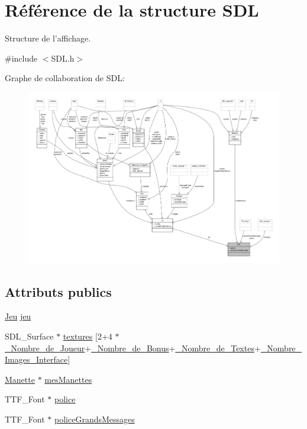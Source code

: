 \hypertarget{structSDL}{\section{Référence de la structure S\-D\-L}
\label{structSDL}
}


Structure de l'affichage.  




{\ttfamily \#include $<$S\-D\-L.\-h$>$}



Graphe de collaboration de S\-D\-L\-:
\nopagebreak
\begin{figure}[H]
\begin{center}
\leavevmode
\includegraphics[width=350pt]{structSDL__coll__graph}
\end{center}
\end{figure}
\subsection*{Attributs publics}
\begin{DoxyCompactItemize}
\item 
\hyperlink{structJeu}{Jeu} \hyperlink{structSDL_aed6e34a843f7e278abbc6401e7a86748}{jeu}
\item 
S\-D\-L\-\_\-\-Surface $\ast$ \hyperlink{structSDL_a7a8c5288d76cf72d0f5ba90ef4046d58}{textures} \mbox{[}2+4 $\ast$\hyperlink{Constantes_8h_a505b3b803482fbd73a5eafac78db730f}{\-\_\-\-Nombre\-\_\-de\-\_\-\-Joueur}+\hyperlink{Constantes_8h_af4e31715ab308023d6200e64b86b9946}{\-\_\-\-Nombre\-\_\-de\-\_\-\-Bonus}+\hyperlink{Constantes_8h_a64872e3ddf1efd6847f90dbcb0ed21ce}{\-\_\-\-Nombre\-\_\-de\-\_\-\-Textes}+\hyperlink{Constantes_8h_a228aa6ff538af983b44e972225d962b9}{\-\_\-\-Nombre\-\_\-\-Images\-\_\-\-Interface}\mbox{]}
\item 
\hyperlink{structManette}{Manette} $\ast$ \hyperlink{structSDL_ace23bf8418b8f58e086b6e608e9d0ba0}{mes\-Manettes}
\item 
T\-T\-F\-\_\-\-Font $\ast$ \hyperlink{structSDL_a1ad36295e29f111c716ccdb0e7265a4e}{police}
\item 
T\-T\-F\-\_\-\-Font $\ast$ \hyperlink{structSDL_a6b8f503288d42f8dbe8bb3ff97629404}{police\-Grands\-Messages}
\end{DoxyCompactItemize}


